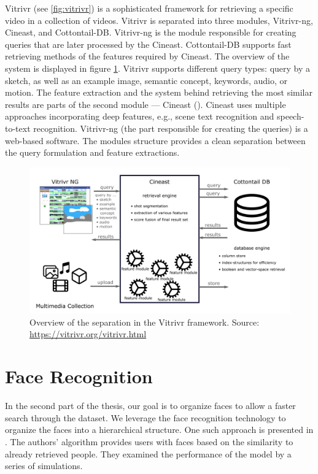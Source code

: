 Vitrivr \citep{rossetto2016vitrivr}(see \autoref{fig:vitrivr}) is a sophisticated framework for retrieving a specific video in a collection of videos. Vitrivr is separated into three modules, Vitrivr-ng, Cineast, and Cottontail-DB.  Vitrivr-ng is the module responsible for creating queries that are later processed by the Cineast. Cottontail-DB supports fast retrieving methods of the features required by Cineast. The overview of the system is displayed in figure \ref{fig:vitrivr}. Vitrivr supports different query types: query by a sketch, as well as an example image, semantic concept, keywords, audio, or motion. The feature extraction and the system behind retrieving the most similar results are parts of the second module --- Cineast (\cite{rossetto2016searching}). Cineast uses multiple approaches incorporating deep features, e.g., scene text recognition and speech-to-text recognition. Vitrivr-ng (the part responsible for creating the queries) is a web-based software. The modules structure provides a clean separation between the query formulation and feature extractions.

\begin{figure}
    \centering
    \includegraphics[width=\linewidth]{img/vitrivr.png}
    \caption[Overview of the separation in the Vitrivr framework]{Overview of the separation in the Vitrivr framework. Source: \url{https://vitrivr.org/vitrivr.html}}
    \label{fig:vitrivr}
\end{figure}

\section{Face Recognition}

In the second part of the thesis, our goal is to organize faces to allow a faster search through the dataset. We leverage the face recognition technology to organize the faces into a hierarchical structure. One such approach is presented in \citep{girgensohn2004leveraging}. The authors' algorithm provides users with faces based on the similarity to already retrieved people. They examined the performance of the model by a series of simulations. 

